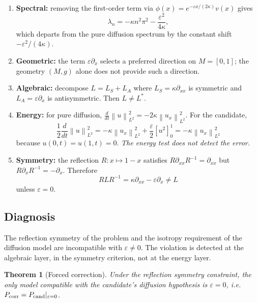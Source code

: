\documentclass[11pt,a4paper]{article}
\theoremstyle{definition}
\theoremstyle{plain}
\newtheorem{theorem}[definition]{Theorem}
\newcommand{\Norm}[1]{\left\lVert #1 \right\rVert}
\begin{document}
\begin{enumerate}[label=(\arabic*)]
  \item \textbf{Spectral:} removing the first-order term via
        $\phi(x) = e^{-\varepsilon x/(2\kappa)} v(x)$ gives
        \[
          \lambda_n = -\kappa n^2 \pi^2 - \frac{\varepsilon^2}{4\kappa},
        \]
        which departs from the pure diffusion spectrum by the
        constant shift $-\varepsilon^2/(4\kappa)$.
  \item \textbf{Geometric:} the term $\varepsilon \partial_x$
        selects a preferred direction on $M = [0,1]$; the geometry
        $(M, g)$ alone does not provide such a direction.
  \item \textbf{Algebraic:} decompose $L = L_S + L_A$ where
        $L_S = \kappa \partial_{xx}$ is symmetric and
        $L_A = \varepsilon \partial_x$ is antisymmetric. Then
        $L \neq L^\ast$.
  \item \textbf{Energy:} for pure diffusion,
        $\frac{d}{dt} \Norm{u}_{L^2}^2 = -2\kappa \Norm{u_x}_{L^2}^2$.
        For the candidate,
        \[
          \frac{1}{2}\frac{d}{dt} \Norm{u}_{L^2}^2
          =
          -\kappa \Norm{u_x}_{L^2}^2
          +
          \frac{\varepsilon}{2} [u^2]_0^1
          =
          -\kappa \Norm{u_x}_{L^2}^2
        \]
        because $u(0,t) = u(1,t) = 0$. \emph{The energy test does not
        detect the error.}
  \item \textbf{Symmetry:} the reflection $R : x \mapsto 1 - x$
        satisfies $R \partial_{xx} R^{-1} = \partial_{xx}$ but
        $R \partial_x R^{-1} = -\partial_x$. Therefore
        \[
          R L R^{-1} = \kappa \partial_{xx} - \varepsilon \partial_x
          \neq L
        \]
        unless $\varepsilon = 0$.
\end{enumerate}

\subsection{Diagnosis}

The reflection symmetry of the problem and the isotropy requirement
of the diffusion model are incompatible with $\varepsilon \neq 0$.
The violation is detected at the algebraic layer, in the symmetry
criterion, not at the energy layer.

\begin{theorem}[Forced correction]\label{thm:forced-correction}
Under the reflection symmetry constraint, the only model compatible
with the candidate's diffusion hypothesis is $\varepsilon = 0$,
i.e.\ $P_{\rm corr} = P_{\rm cand}|_{\varepsilon = 0}$.
\end{theorem}
\end{document}
